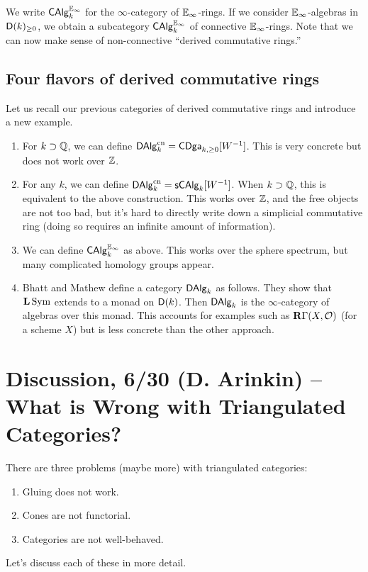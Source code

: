 \documentclass{amsart}
\begin{document}
We write $\mathsf{CAlg}_k^{\mathbb{E}_\infty}$ for the $\infty$-category of $\mathbb{E}_\infty$-rings.
If we consider $\mathbb{E}_\infty$-algebras in $\mathsf{D}(k)_{\geq 0}$, we obtain a subcategory $\mathsf{CAlg}_k^{\mathbb{E}_\infty}$ of connective $\mathbb{E}_\infty$-rings.
Note that we can now make sense of non-connective ``derived commutative rings.''

\subsection{Four flavors of derived commutative rings}

Let us recall our previous categories of derived commutative rings and introduce a new example.
\begin{enumerate}
	\item For $k \supset \mathbb{Q}$, we can define $\mathsf{DAlg}_k^{\mathrm{cn}} = \mathsf{CDga}_{k, \geq 0}[W^{-1}]$.
		This is very concrete but does not work over $\mathbb{Z}$.
	\item For any $k$, we can define $\mathsf{DAlg}_k^{\mathrm{cn}} = \mathsf{s}\mathsf{CAlg}_k[W^{-1}]$.
		When $k \supset \mathbb{Q}$, this is equivalent to the above construction.
		This works over $\mathbb{Z}$, and the free objects are not too bad, but it's hard to directly write down a simplicial commutative ring (doing so requires an infinite amount of information).
	\item We can define $\mathsf{CAlg}_k^{\mathbb{E}_\infty}$ as above.
		This works over the sphere spectrum, but many complicated homology groups appear.
	\item Bhatt and Mathew define a category $\mathsf{DAlg}_k$ as follows.
		They show that $\mathbf{L} \operatorname{Sym}$ extends to a monad on $\mathsf{D}(k)$.
		Then $\mathsf{DAlg}_k$ is the $\infty$-category of algebras over this monad.
		This accounts for examples such as $\mathbf{R} \Gamma(X, \mathcal{O})$ (for a scheme $X$) but is less concrete than the other approach.
\end{enumerate}

\section*{Discussion, 6/30 (D. Arinkin) -- What is Wrong with Triangulated Categories?}

There are three problems (maybe more) with triangulated categories:
\begin{enumerate}
	\item Gluing does not work.
	\item Cones are not functorial.
	\item Categories are not well-behaved.
\end{enumerate}
Let's discuss each of these in more detail.
\end{document}
